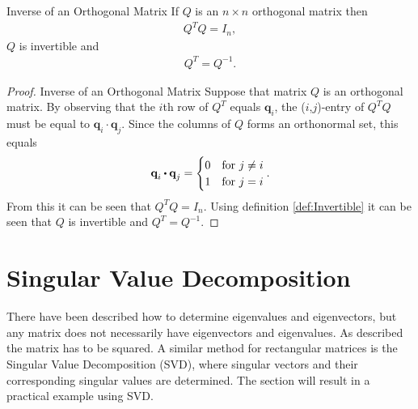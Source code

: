 \begin{theorem}{Inverse of an Orthogonal Matrix}
    If $Q$ is an $n\times n$ orthogonal matrix then
    \begin{align*}
        Q^T Q = I_n,
    \end{align*}
    $Q$ is invertible and
    \begin{align*}
        Q^T = Q^{-1}.
    \end{align*}
    \cite[413]{LiAl}
\end{theorem}
\begin{proof}{Inverse of an Orthogonal Matrix}
    Suppose that matrix $Q$ is an orthogonal matrix.
    By observing that the $i$th row of $Q^T$ equals $\textbf{q}_i$, the ($i$,$j$)-entry of $Q^TQ$ must be equal to $\textbf{q}_i\cdot\textbf{q}_j$. Since the columns of $Q$ forms an orthonormal set, this equals 
    \begin{align*}
        \textbf{q}_i\vprik\textbf{q}_j=
    \begin{cases}
          0 & \text{for } j\neq i\\
          1 & \text{for } j= i
    \end{cases}.
    \end{align*}
    From this it can be seen that $Q^TQ=I_n$. Using definition \ref{def:Invertible} it can be seen that $Q$ is invertible and $Q^T=Q^{-1}$.
    \qedsymbol 
\end{proof}
\section{Singular Value Decomposition}
There have been described how to determine eigenvalues and eigenvectors, but any matrix does not necessarily have eigenvectors and eigenvalues. As described the matrix has to be squared. A similar method for rectangular matrices is the Singular Value Decomposition (SVD), where singular vectors and their corresponding singular values are determined. The section will result in a practical example using SVD.

